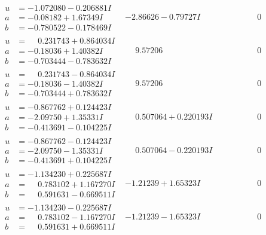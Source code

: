\documentclass[1p]{elsarticle_modified}
\theoremstyle{definition}
\begin{document}
$$\begin{array}{c|c|c}
\begin{aligned}
u &= -1.072080 - 0.206881 I \\
a &= -0.08182 + 1.67349 I \\
b &= -0.780522 - 0.178469 I\end{aligned}
 & -2.86626 - 0.79727 I & \phantom{-0.000000 } 0 \\ \hline\begin{aligned}
u &= \phantom{-}0.231743 + 0.864034 I \\
a &= -0.18036 + 1.40382 I \\
b &= -0.703444 - 0.783632 I\end{aligned}
 & \phantom{-}9.57206\phantom{ +0.000000I} & \phantom{-0.000000 } 0 \\ \hline\begin{aligned}
u &= \phantom{-}0.231743 - 0.864034 I \\
a &= -0.18036 - 1.40382 I \\
b &= -0.703444 + 0.783632 I\end{aligned}
 & \phantom{-}9.57206\phantom{ +0.000000I} & \phantom{-0.000000 } 0 \\ \hline\begin{aligned}
u &= -0.867762 + 0.124423 I \\
a &= -2.09750 + 1.35331 I \\
b &= -0.413691 - 0.104225 I\end{aligned}
 & \phantom{-}0.507064 + 0.220193 I & \phantom{-0.000000 } 0 \\ \hline\begin{aligned}
u &= -0.867762 - 0.124423 I \\
a &= -2.09750 - 1.35331 I \\
b &= -0.413691 + 0.104225 I\end{aligned}
 & \phantom{-}0.507064 - 0.220193 I & \phantom{-0.000000 } 0 \\ \hline\begin{aligned}
u &= -1.134230 + 0.225687 I \\
a &= \phantom{-}0.783102 + 1.167270 I \\
b &= \phantom{-}0.591631 - 0.669511 I\end{aligned}
 & -1.21239 + 1.65323 I & \phantom{-0.000000 } 0 \\ \hline\begin{aligned}
u &= -1.134230 - 0.225687 I \\
a &= \phantom{-}0.783102 - 1.167270 I \\
b &= \phantom{-}0.591631 + 0.669511 I\end{aligned}
 & -1.21239 - 1.65323 I & \phantom{-0.000000 } 0 \\ \hline\begin{aligned}

\end{aligned}
\end{array}$$
\end{document}
